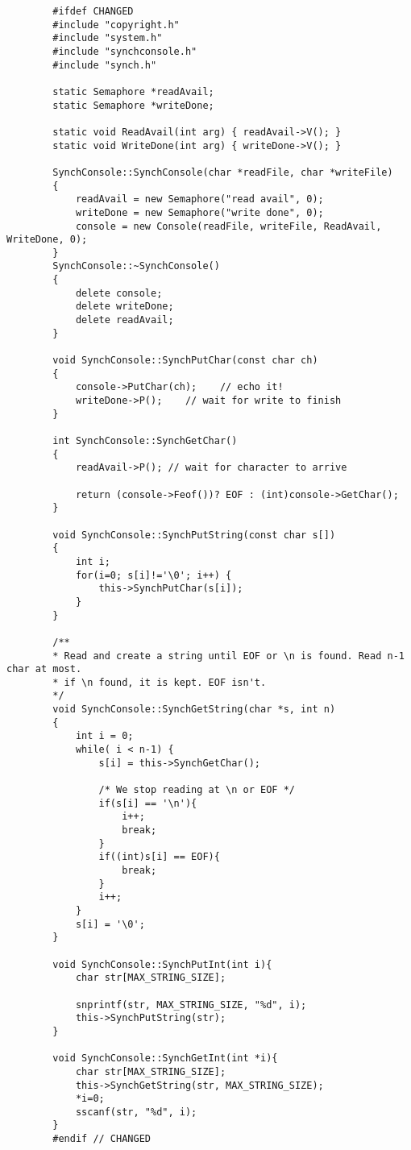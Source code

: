 \documentclass[a4paper,10pt]{article}
\begin{document}
    \begin{lstlisting}
        #ifdef CHANGED
        #include "copyright.h"
        #include "system.h"
        #include "synchconsole.h"
        #include "synch.h"

        static Semaphore *readAvail;
        static Semaphore *writeDone;

        static void ReadAvail(int arg) { readAvail->V(); }
        static void WriteDone(int arg) { writeDone->V(); }

        SynchConsole::SynchConsole(char *readFile, char *writeFile)
        {
            readAvail = new Semaphore("read avail", 0);
            writeDone = new Semaphore("write done", 0);
            console = new Console(readFile, writeFile, ReadAvail, WriteDone, 0);
        }
        SynchConsole::~SynchConsole()
        {
            delete console;
            delete writeDone;
            delete readAvail;
        }

        void SynchConsole::SynchPutChar(const char ch)
        {
            console->PutChar(ch);    // echo it!
            writeDone->P();    // wait for write to finish
        }

        int SynchConsole::SynchGetChar()
        {
            readAvail->P(); // wait for character to arrive

            return (console->Feof())? EOF : (int)console->GetChar();
        }

        void SynchConsole::SynchPutString(const char s[])
        {
            int i;
            for(i=0; s[i]!='\0'; i++) {
                this->SynchPutChar(s[i]);
            }
        }

        /**
        * Read and create a string until EOF or \n is found. Read n-1 char at most.
        * if \n found, it is kept. EOF isn't.
        */
        void SynchConsole::SynchGetString(char *s, int n)
        {
            int i = 0;
            while( i < n-1) {
                s[i] = this->SynchGetChar();

                /* We stop reading at \n or EOF */
                if(s[i] == '\n'){
                    i++;
                    break;
                }
                if((int)s[i] == EOF){
                    break;
                }
                i++;
            }
            s[i] = '\0';
        }

        void SynchConsole::SynchPutInt(int i){
            char str[MAX_STRING_SIZE];

            snprintf(str, MAX_STRING_SIZE, "%d", i);
            this->SynchPutString(str);
        }

        void SynchConsole::SynchGetInt(int *i){
            char str[MAX_STRING_SIZE];
            this->SynchGetString(str, MAX_STRING_SIZE);
            *i=0;
            sscanf(str, "%d", i);
        }
        #endif // CHANGED
    \end{lstlisting}
\end{document}

